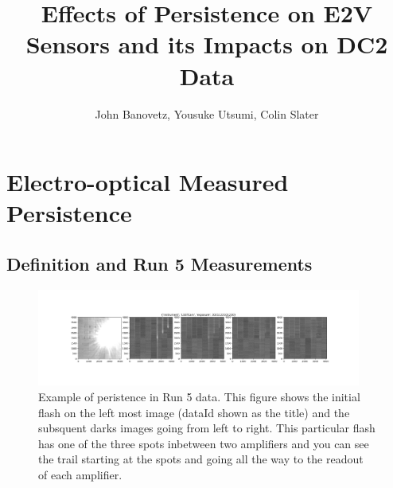 \documentclass[DM,authoryear,toc]{lsstdoc}
\title{Effects of Persistence on E2V Sensors and its Impacts on DC2 Data}
\author{%
John Banovetz,
Yousuke Utsumi,
Colin Slater
}
\date{\vcsDate}
\begin{document}
\maketitle


\section{Electro-optical Measured Persistence}

\subsection{Definition and Run 5 Measurements}

\begin{figure}[!htp]
  \centering
  \includegraphics[width=0.95\textwidth, angle=0]{Run_5_persistence_ex.png}
  \caption{
  Example of peristence in Run 5 data. 
  This figure shows the initial flash on the left most image (dataId shown as the title) and the subsquent darks images going from left to right.
  This particular flash has one of the three spots inbetween two amplifiers and you can see the trail starting at the spots and going all the way to the readout of each amplifier.
  }\label{fig:ex_persistence_Run5}
\end{figure}
\end{document}
